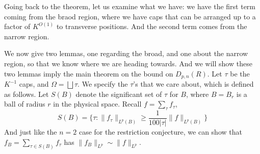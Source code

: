 Going back to the theorem, let us examine what we have: we have the first term coming from the braod region, where we have caps that can be arranged up to a factor of $K^{O(1)}$ to transverse positions. And the second term comes from the narrow region.

We now give two lemmas, one regarding the broad, and one about the narrow region, so that we know where we are heading towards. And we will show these two lemmas imply the main theorem on the bound on $D_{p,n}(R)$.
Let $\tau$ be the $K^{-1}$ caps, and $\Omega=\bigsqcup\tau$. We specify the $\tau$'s that we care about, which is defined as follows. Let $S(B)$ denote the significant set of $\tau$ for $B$, where $B=B_r$ is a ball of radius $r$ in the physical space. Recall $f=\sum_\tau f_\tau$,
\begin{equation*}
    S(B)=\{\tau: \|f_\tau\|_{L^p(B)}\geq\frac{1}{100 |\tau|}\|f\|_{L^p(B)}\}
\end{equation*}
And just like the $n=2$ case for the restriction conjecture, we can show that $f_B=\sum_{\tau\in S(B)}f_\tau$ has $\|f_B\|_{L^p}\sim\|f\|_{L^p}$.

